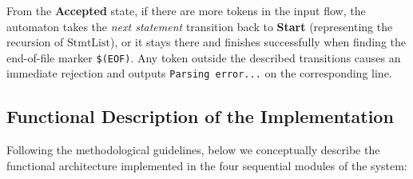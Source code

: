 \documentclass[letterpaper,12pt,oneside]{article}
\begin{document}
From the \textbf{Accepted} state, if there are more tokens in the input flow, the automaton takes the \textit{next statement} transition back to \textbf{Start} (representing the recursion of $\text{StmtList}$), or it stays there and finishes successfully when finding the end-of-file marker \texttt{\$(EOF)}. Any token outside the described transitions causes an immediate rejection and outputs \texttt{Parsing error...} on the corresponding line.

\subsection{Functional Description of the Implementation}
Following the methodological guidelines, below we conceptually describe the functional architecture implemented in the four sequential modules of the system:
\end{document}
